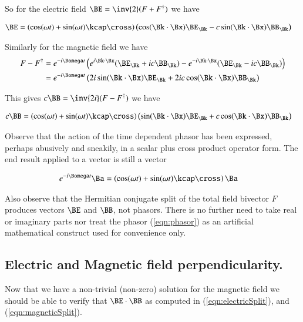 So for the electric field $\BE = \inv{2}(F + F^\dagger)$ we have

\begin{align}\label{eqn:electricSplit}
\BE &= 
\left( \cos(\omega t) + \sin(\omega t) \kcap \cross \right)
\left(
 \cos(\Bk \cdot \Bx) \BE_\Bk 
- c \sin(\Bk \cdot \Bx) \BB_\Bk 
\right) 
\end{align}

Similarly for the magnetic field we have
\begin{align*}
F - F^\dagger
&=
e^{-i\Bomega t} \left(
 e^{i \Bk \cdot \Bx} (\BE_\Bk + i c \BB_\Bk) 
-e^{-i \Bk \cdot \Bx} (\BE_\Bk - i c \BB_\Bk)  
\right) \\
&=
e^{-i\Bomega t} \left(
 2 i \sin(\Bk \cdot \Bx) \BE_\Bk 
+ 2 i c \cos(\Bk \cdot \Bx) \BB_\Bk 
\right) \\
\end{align*}

This gives $c \BB = \inv{2i}(F - F^\dagger)$ we have

\begin{align}\label{eqn:magneticSplit}
c \BB &=
\left( \cos(\omega t) + \sin(\omega t) \kcap \cross \right)
\left(
 \sin(\Bk \cdot \Bx) \BE_\Bk 
+ c \cos(\Bk \cdot \Bx) \BB_\Bk 
\right) 
\end{align}

Observe that the action of the time dependent phasor has been expressed, perhaps abusively and sneakily, in a scalar plus cross product operator form.  The end result applied to a vector is still a vector

\begin{align*}
e^{-i\Bomega t} \Ba
&=
\left( \cos(\omega t) + \sin(\omega t) \kcap \cross \right) \Ba
\end{align*}

Also observe that the Hermitian conjugate split of the total field bivector $F$ produces vectors $\BE$ and $\BB$, not phasors.  There is no further need to take real or imaginary parts nor treat the phasor (\ref{eqn:phasor}) as an artificial mathematical construct used for convenience only.

\subsection{Electric and Magnetic field perpendicularity.}

Now that we have a non-trivial (non-zero) solution for the magnetic field we should be able to verify that $\BE \cdot \BB$ as computed in (\ref{eqn:electricSplit}), and (\ref{eqn:magneticSplit}).

